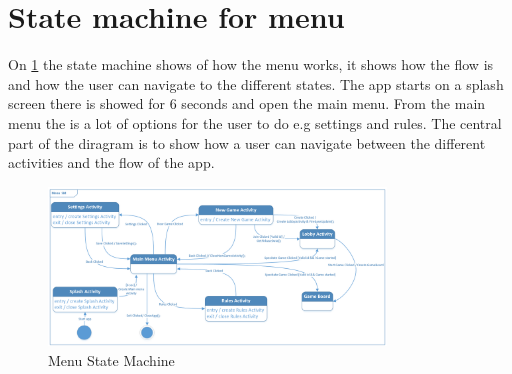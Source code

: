 \section{State machine for menu}

On \ref{StateMachine} the state machine shows of how the  menu works, it shows how the flow is and how the user can navigate to the different states. The app starts on a splash screen there is showed for 6 seconds and open the main menu. From the main menu the is a lot of options for the user to do e.g settings and rules. The central part of the diragram is to show how a user can navigate between the different activities and the flow of the app.

\begin{figure}
	\centering
	\includegraphics[width=0.8\textwidth]{images/Menu_State_Machine.png}
	\caption{Menu State Machine \label{StateMachine}}
\end{figure}